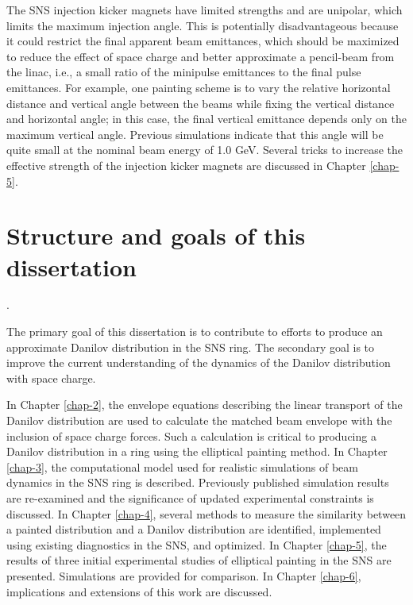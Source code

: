 The SNS injection kicker magnets have limited strengths and are unipolar, which limits the maximum injection angle. This is potentially disadvantageous because it could restrict the final apparent beam emittances, which should be maximized to reduce the effect of space charge and better approximate a pencil-beam from the linac, i.e., a small ratio of the minipulse emittances to the final pulse emittances. For example, one painting scheme is to vary the relative horizontal distance and vertical angle between the beams while fixing the vertical distance and horizontal angle; in this case, the final vertical emittance depends only on the maximum vertical angle. Previous simulations indicate that this angle will be quite small at the nominal beam energy of 1.0 GeV. Several tricks to increase the effective strength of the injection kicker magnets are discussed in Chapter \ref{chap-5}.


\section{Structure and goals of this dissertation}\label{sec:Goals of this dissertation}.

The primary goal of this dissertation is to contribute to efforts to produce an approximate Danilov distribution in the SNS ring. The secondary goal is to improve the current understanding of the dynamics of the Danilov distribution with space charge. 

In Chapter \ref{chap-2}, the envelope equations describing the linear transport of the Danilov distribution are used to calculate the matched beam envelope with the inclusion of space charge forces. Such a calculation is critical to producing a Danilov distribution in a ring using the elliptical painting method. In Chapter \ref{chap-3}, the computational model used for realistic simulations of beam dynamics in the SNS ring is described. Previously published simulation results are re-examined and the significance of updated experimental constraints is discussed. In Chapter \ref{chap-4}, several methods to measure the similarity between a painted distribution and a Danilov distribution are identified, implemented using existing diagnostics in the SNS, and optimized. In Chapter \ref{chap-5}, the results of three initial experimental studies of elliptical painting in the SNS are presented. Simulations are provided for comparison. In Chapter \ref{chap-6}, implications and extensions of this work are discussed.